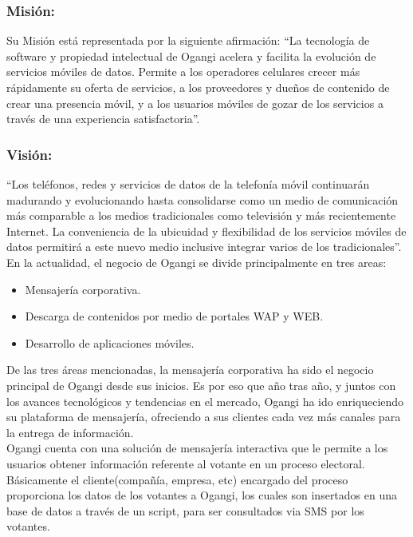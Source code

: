 \documentclass[spanish]{article}
\begin{document}
\subsubsection{Misión:}
Su Misión está representada por la siguiente afirmación:
“La tecnología de software y propiedad intelectual de Ogangi acelera y facilita la evolución
de servicios móviles de datos. Permite a los operadores celulares crecer más rápidamente su
oferta de servicios, a los proveedores y dueños de contenido de crear una presencia móvil, y a
los usuarios móviles de gozar de los servicios a través de una experiencia satisfactoria”.

\subsubsection{Visión:}
“Los teléfonos, redes y servicios de datos de la telefonía móvil continuarán madurando y
evolucionando hasta consolidarse como un medio de comunicación más comparable a los
medios tradicionales como televisión y más recientemente Internet. La conveniencia de la
ubicuidad y flexibilidad de los servicios móviles de datos permitirá a este nuevo medio inclusive
integrar varios de los tradicionales”. \\

En la actualidad, el negocio de Ogangi se divide principalmente en tres areas:

\begin{itemize}
	
	\item Mensajería corporativa.	 
	\item Descarga de contenidos por medio de portales WAP y WEB. 	 
	\item Desarrollo de aplicaciones móviles. 	 
\end{itemize}

De las tres áreas mencionadas, la mensajería corporativa ha sido el negocio principal de Ogangi desde sus inicios. Es por eso que año tras año, y juntos con los avances tecnológicos y tendencias en el mercado, Ogangi ha ido enriqueciendo su plataforma de mensajería, ofreciendo a sus clientes cada vez más canales para la entrega de información. \\

Ogangi cuenta con una solución de mensajería interactiva que le permite a los usuarios obtener información referente al votante en un proceso electoral. \\
Básicamente el cliente(compañía, empresa, etc) encargado del proceso proporciona los datos de los votantes a Ogangi, los cuales son insertados en una base de datos a través de un script, para ser consultados via SMS por los votantes.
\end{document}
